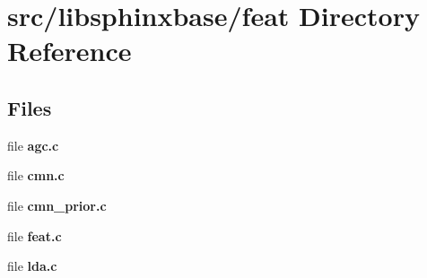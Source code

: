 \section{src/libsphinxbase/feat Directory Reference}
\label{dir_4d78eab29b32367e0c8277af3fb65de0}
\subsection*{Files}
\begin{DoxyCompactItemize}
\item 
file {\bfseries agc.\-c}
\item 
file {\bfseries cmn.\-c}
\item 
file {\bfseries cmn\-\_\-prior.\-c}
\item 
file {\bfseries feat.\-c}
\item 
file {\bfseries lda.\-c}
\end{DoxyCompactItemize}
